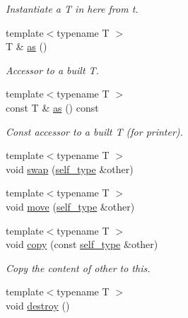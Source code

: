 \begin{DoxyCompactItemize}
\begin{DoxyCompactList}\small\item\em Instantiate a {\itshape T} in here from {\itshape t}. \end{DoxyCompactList}\item 
{\footnotesize template$<$typename T $>$ }\\T \& \hyperlink{structyy_1_1variant_a7fae4866c8d57a6f2ea30e9926e367cd}{as} ()\hypertarget{structyy_1_1variant_a7fae4866c8d57a6f2ea30e9926e367cd}{}\label{structyy_1_1variant_a7fae4866c8d57a6f2ea30e9926e367cd}

\begin{DoxyCompactList}\small\item\em Accessor to a built {\itshape T}. \end{DoxyCompactList}\item 
{\footnotesize template$<$typename T $>$ }\\const T \& \hyperlink{structyy_1_1variant_a7930977f8a1b707c687daec8b0d76e70}{as} () const \hypertarget{structyy_1_1variant_a7930977f8a1b707c687daec8b0d76e70}{}\label{structyy_1_1variant_a7930977f8a1b707c687daec8b0d76e70}

\begin{DoxyCompactList}\small\item\em Const accessor to a built {\itshape T} (for printer). \end{DoxyCompactList}\item 
{\footnotesize template$<$typename T $>$ }\\void \hyperlink{structyy_1_1variant_ac43b5ffdcedbda5462c53832027707ac}{swap} (\hyperlink{structyy_1_1variant_afbd75aee339bd9fa06e6fa8f320cecd3}{self\+\_\+type} \&other)
\item 
{\footnotesize template$<$typename T $>$ }\\void \hyperlink{structyy_1_1variant_ae71b4ef21f1446b328b9d93dbc6806e1}{move} (\hyperlink{structyy_1_1variant_afbd75aee339bd9fa06e6fa8f320cecd3}{self\+\_\+type} \&other)
\item 
{\footnotesize template$<$typename T $>$ }\\void \hyperlink{structyy_1_1variant_a526d966e2923f6ae1d3fab2e1eac5311}{copy} (const \hyperlink{structyy_1_1variant_afbd75aee339bd9fa06e6fa8f320cecd3}{self\+\_\+type} \&other)\hypertarget{structyy_1_1variant_a526d966e2923f6ae1d3fab2e1eac5311}{}\label{structyy_1_1variant_a526d966e2923f6ae1d3fab2e1eac5311}

\begin{DoxyCompactList}\small\item\em Copy the content of {\itshape other} to this. \end{DoxyCompactList}\item 
{\footnotesize template$<$typename T $>$ }\\void \hyperlink{structyy_1_1variant_a20a07d58bf12eda819ad013c5d9853cb}{destroy} ()\hypertarget{structyy_1_1variant_a20a07d58bf12eda819ad013c5d9853cb}{}\label{structyy_1_1variant_a20a07d58bf12eda819ad013c5d9853cb}


\end{DoxyCompactItemize}

